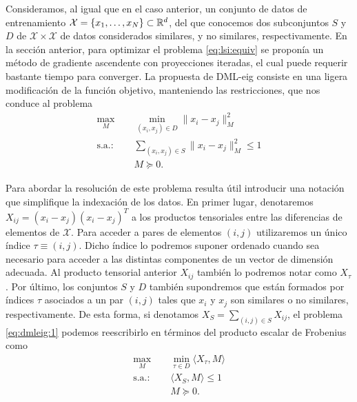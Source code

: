 Consideramos, al igual que en el caso anterior, un conjunto de datos de entrenamiento $\mathcal{X} = \{x_1,\dots,x_N\} \subset \mathbb{R}^d$, del que conocemos dos subconjuntos $S$ y $D$ de $\mathcal{X}\times\mathcal{X}$ de datos considerados similares, y no similares, respectivamente. En la sección anterior, para optimizar el problema \ref{eq:lsi:equiv} se proponía un método de gradiente ascendente con proyecciones iteradas, el cual puede requerir bastante tiempo para converger. La propuesta de DML-eig consiste en una ligera modificación de la función objetivo, manteniendo las restricciones, que nos conduce al problema
\begin{equation} \label{eq:dmleig:1}
\begin{split}
    \max_{M} &\quad \min_{(x_i,x_j)\in D}  \|x_i - x_j \|_M^2 \\
    \text{s.a.: } &\quad \sum_{(x_i,x_j) \in S} \|x_i - x_j\|_M^2 \le 1 \\
                  &\quad M \succeq 0.
\end{split}
\end{equation}

Para abordar la resolución de este problema resulta útil introducir una notación que simplifique la indexación de los datos. En primer lugar, denotaremos $X_{ij} = (x_i-x_j)(x_i-x_j)^T$ a los productos tensoriales entre las diferencias de elementos de $\mathcal{X}$. Para acceder a pares de elementos $(i,j)$ utilizaremos un único índice $\tau \equiv (i,j)$. Dicho índice lo podremos suponer ordenado cuando sea necesario para acceder a las distintas componentes de un vector de dimensión adecuada. Al producto tensorial anterior $X_{ij}$ también lo podremos notar como $X_{\tau}$. Por último, los conjuntos $S$ y $D$ también supondremos que están formados por índices $\tau$ asociados a un par $(i,j)$ tales que $x_i$ y $x_j$ son similares o no similares, respectivamente. De esta forma, si denotamos $X_S = \sum_{(i,j)\in S}X_{ij}$, el problema \ref{eq:dmleig:1} podemos reescribirlo en términos del producto escalar de Frobenius como
\begin{equation} \label{eq:dmleig:2}
\begin{split}
    \max_{M} &\quad \min_{\tau \in D}  \langle X_{\tau}, M \rangle \\
    \text{s.a.: } &\quad \langle X_S, M \rangle \le 1 \\
                  &\quad M \succeq 0.
\end{split}
\end{equation}

